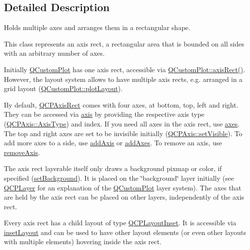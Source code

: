 \subsection{Detailed Description}
Holds multiple axes and arranges them in a rectangular shape. 

This class represents an axis rect, a rectangular area that is bounded on all sides with an arbitrary number of axes.

Initially \hyperlink{class_q_custom_plot}{Q\+Custom\+Plot} has one axis rect, accessible via \hyperlink{class_q_custom_plot_a4a37a1add5fe63060ac518cf0a4c4050}{Q\+Custom\+Plot\+::axis\+Rect()}. However, the layout system allows to have multiple axis rects, e.\+g. arranged in a grid layout (\hyperlink{class_q_custom_plot_afd280d4d621ae64a106543a545c508d7}{Q\+Custom\+Plot\+::plot\+Layout}).

By default, \hyperlink{class_q_c_p_axis_rect}{Q\+C\+P\+Axis\+Rect} comes with four axes, at bottom, top, left and right. They can be accessed via \hyperlink{class_q_c_p_axis_rect_a560de44e47a4af0f86c59102a094b1e4}{axis} by providing the respective axis type (\hyperlink{class_q_c_p_axis_ae2bcc1728b382f10f064612b368bc18a}{Q\+C\+P\+Axis\+::\+Axis\+Type}) and index. If you need all axes in the axis rect, use \hyperlink{class_q_c_p_axis_rect_a66654d51ca611ef036ded36250cd2518}{axes}. The top and right axes are set to be invisible initially (\hyperlink{class_q_c_p_layerable_a3bed99ddc396b48ce3ebfdc0418744f8}{Q\+C\+P\+Axis\+::set\+Visible}). To add more axes to a side, use \hyperlink{class_q_c_p_axis_rect_a2dc336092ccc57d44a46194c8a23e4f4}{add\+Axis} or \hyperlink{class_q_c_p_axis_rect_a792e1f3d9cb1591fca135bb0de9b81fc}{add\+Axes}. To remove an axis, use \hyperlink{class_q_c_p_axis_rect_a03c39cd9704f0d36fb6cf980cdddcbaa}{remove\+Axis}.

The axis rect layerable itself only draws a background pixmap or color, if specified (\hyperlink{class_q_c_p_axis_rect_af615ab5e52b8e0a9a0eff415b6559db5}{set\+Background}). It is placed on the \char`\"{}background\char`\"{} layer initially (see \hyperlink{class_q_c_p_layer}{Q\+C\+P\+Layer} for an explanation of the \hyperlink{class_q_custom_plot}{Q\+Custom\+Plot} layer system). The axes that are held by the axis rect can be placed on other layers, independently of the axis rect.

Every axis rect has a child layout of type \hyperlink{class_q_c_p_layout_inset}{Q\+C\+P\+Layout\+Inset}. It is accessible via \hyperlink{class_q_c_p_axis_rect_a4114887c7141b59650b7488f930993e5}{inset\+Layout} and can be used to have other layout elements (or even other layouts with multiple elements) hovering inside the axis rect.

